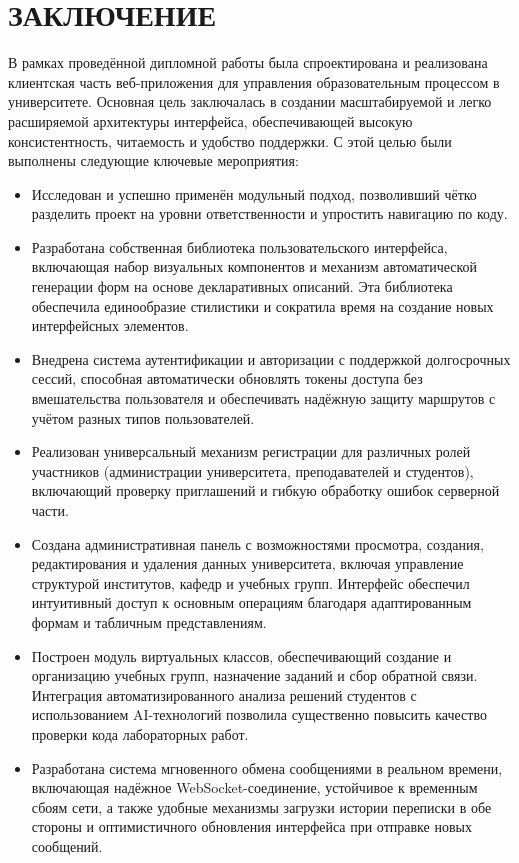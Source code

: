 \newpage
{}
\section*{ЗАКЛЮЧЕНИЕ}

В рамках проведённой дипломной работы была спроектирована и реализована клиентская часть веб-приложения для управления образовательным процессом в университете. Основная цель заключалась в создании масштабируемой и легко расширяемой архитектуры интерфейса, обеспечивающей высокую консистентность, читаемость и удобство поддержки. С этой целью были выполнены следующие ключевые мероприятия:

\begin{itemize}
  \item 
  Исследован и успешно применён модульный подход, позволивший чётко разделить проект на уровни ответственности и упростить навигацию по коду.

  \item 
  Разработана собственная библиотека пользовательского интерфейса, включающая набор визуальных компонентов и механизм автоматической генерации форм на основе декларативных описаний. Эта библиотека обеспечила единообразие стилистики и сократила время на создание новых интерфейсных элементов.

  \item 
  Внедрена система аутентификации и авторизации с поддержкой долгосрочных сессий, способная автоматически обновлять токены доступа без вмешательства пользователя и обеспечивать надёжную защиту маршрутов с учётом разных типов пользователей.

  \item 
  Реализован универсальный механизм регистрации для различных ролей участников (администрации университета, преподавателей и студентов), включающий проверку приглашений и гибкую обработку ошибок серверной части.

  \item 
  Создана административная панель с возможностями просмотра, создания, редактирования и удаления данных университета, включая управление структурой институтов, кафедр и учебных групп. Интерфейс обеспечил интуитивный доступ к основным операциям благодаря адаптированным формам и табличным представлениям.

  \item 
  Построен модуль виртуальных классов, обеспечивающий создание и организацию учебных групп, назначение заданий и сбор обратной связи. Интеграция автоматизированного анализа решений студентов с использованием AI-технологий позволила существенно повысить качество проверки кода лабораторных работ.

  \item 
  Разработана система мгновенного обмена сообщениями в реальном времени, включающая надёжное WebSocket-соединение, устойчивое к временным сбоям сети, а также удобные механизмы загрузки истории переписки в обе стороны и оптимистичного обновления интерфейса при отправке новых сообщений.
\end{itemize}

